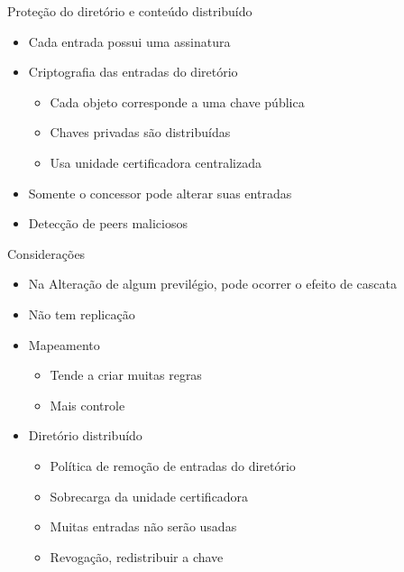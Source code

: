\documentclass{beamer}
\begin{document}
  \begin{frame}{Proteção do diretório e conteúdo distribuído}
    \begin{itemize}
     \item Cada entrada possui uma assinatura
     \item Criptografia das entradas do diretório
     \begin{itemize}
      \item Cada objeto corresponde a uma chave pública
      \item Chaves privadas são distribuídas
      \item Usa unidade certificadora centralizada
     \end{itemize}
     \item Somente o concessor pode alterar suas entradas
     \item Detecção de peers maliciosos
    \end{itemize}
   
  \end{frame}
  
  \begin{frame}{Considerações}
   \begin{itemize}
    \item Na Alteração de algum previlégio, pode ocorrer o efeito de cascata
    \item Não tem replicação
    \item Mapeamento
    \begin{itemize}
     \item Tende a criar muitas regras
     \item Mais controle
    \end{itemize}
    \item Diretório distribuído
    \begin{itemize}
     \item Política de remoção de entradas do diretório
     \item Sobrecarga da unidade certificadora
     \item Muitas entradas não serão usadas
     \item Revogação, redistribuir a chave
    \end{itemize}
   \end{itemize}
  \end{frame}
\end{document}
